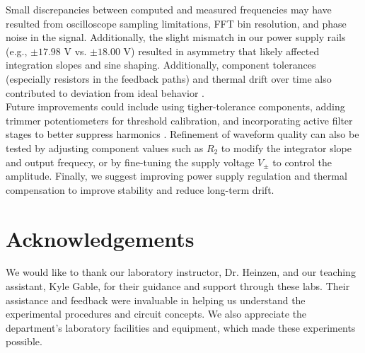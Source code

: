 \documentclass{article}
\begin{document}
\noindent Small discrepancies between computed and measured frequencies may
have resulted from oscilloscope sampling limitations, FFT bin resolution, and
phase noise in the signal. Additionally, the slight mismatch in our power
supply rails (e.g., $\pm 17.98$ V vs. $\pm18.00$ V) resulted in asymmetry that likely
affected integration slopes and sine shaping. Additionally, component
tolerances (especially resistors in the feedback paths) and thermal drift
over time also contributed to deviation from ideal behavior \cite{seddik}.\\

\noindent Future improvements could include using tigher-tolerance components, 
adding trimmer potentiometers for threshold calibration, and incorporating
active filter stages to better suppress harmonics \cite{fallows}. Refinement of waveform
quality can also be tested by adjusting component values such as $R_2$ to
modify the integrator slope and output frequecy, or by fine-tuning the supply
voltage $V_\pm$ to control the amplitude. Finally, we suggest improving
power supply regulation and thermal compensation to improve stability and
reduce long-term drift.\\


\section*{Acknowledgements}

We would like to thank our laboratory instructor, Dr. Heinzen, and our teaching 
assistant, Kyle Gable, for their guidance and support through these labs. Their 
assistance and feedback were invaluable in helping us understand the experimental 
procedures and circuit concepts. We also appreciate the department's laboratory 
facilities and equipment, which made these experiments possible.

\end{document}
